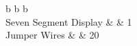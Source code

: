\documentclass[12pt%
                    ]{report}
\begin{document}
\begin{table}[!h]
\begin{tabular}[c]{%
	b{\gnumericColA}%
	b{\gnumericColB}%
	b{\gnumericColC}%
	}
\\
\hhline{|---|}
	 \multicolumn{1}{|p{\gnumericColA}|}%
	{\gnumericPB{\raggedright}Seven Segment Display}
	&\multicolumn{1}{p{\gnumericColB}|}%
	{}
	&\multicolumn{1}{p{\gnumericColC}|}%
	{\gnumericPB{\raggedleft}1}
	\\
\hhline{|---|}
	{\gnumericPB{\raggedright}Jumper Wires}
	&%
	{\gnumericPB{\raggedleft}}
	&%
	{\gnumericPB{\raggedleft}20}
\\
\hhline{|-|-|-|}
\end{tabular}
\caption{}
\label{table:components}
\end{table}
\ifthenelse{\isundefined{\languageshorthands}}{}{\languageshorthands{\languagename}}
\gnumericTableEnd
\end{document}
